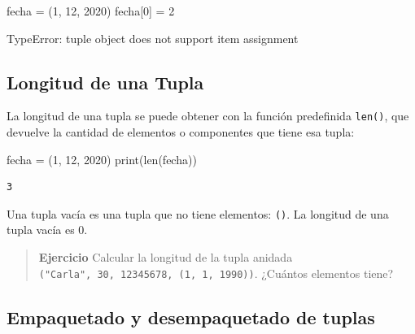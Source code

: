 \documentclass[
  letterpaper,
  DIV=11,
  numbers=noendperiod]{scrreprt}
\newenvironment{Shaded}{\begin{snugshade}}{\end{snugshade}}
\newcommand{\BuiltInTok}[1]{\textcolor[rgb]{0.00,0.23,0.31}{#1}}
\newcommand{\DecValTok}[1]{\textcolor[rgb]{0.68,0.00,0.00}{#1}}
\newcommand{\NormalTok}[1]{\textcolor[rgb]{0.00,0.23,0.31}{#1}}
\newcommand{\OperatorTok}[1]{\textcolor[rgb]{0.37,0.37,0.37}{#1}}
\begin{document}
\begin{Shaded}
\begin{Highlighting}[]
\NormalTok{fecha }\OperatorTok{=}\NormalTok{ (}\DecValTok{1}\NormalTok{, }\DecValTok{12}\NormalTok{, }\DecValTok{2020}\NormalTok{)}
\NormalTok{fecha[}\DecValTok{0}\NormalTok{] }\OperatorTok{=} \DecValTok{2}
\end{Highlighting}
\end{Shaded}

\begin{Shaded}
\begin{Highlighting}[]
\NormalTok{TypeError: \textquotesingle{}tuple\textquotesingle{} object does not support item assignment}
\end{Highlighting}
\end{Shaded}

\subsection{Longitud de una Tupla}\label{longitud-de-una-tupla}

La longitud de una tupla se puede obtener con la función predefinida
\texttt{len()}, que devuelve la cantidad de elementos o componentes que
tiene esa tupla:

\begin{Shaded}
\begin{Highlighting}[]
\NormalTok{fecha }\OperatorTok{=}\NormalTok{ (}\DecValTok{1}\NormalTok{, }\DecValTok{12}\NormalTok{, }\DecValTok{2020}\NormalTok{)}
\BuiltInTok{print}\NormalTok{(}\BuiltInTok{len}\NormalTok{(fecha))}
\end{Highlighting}
\end{Shaded}

\begin{verbatim}
3
\end{verbatim}

Una tupla vacía es una tupla que no tiene elementos: \texttt{()}. La
longitud de una tupla vacía es 0.

\begin{quote}
\textbf{Ejercicio} Calcular la longitud de la tupla anidada
\texttt{("Carla",\ 30,\ 12345678,\ (1,\ 1,\ 1990))}. ¿Cuántos elementos
tiene?
\end{quote}

\subsection{Empaquetado y desempaquetado de
tuplas}\label{empaquetado-y-desempaquetado-de-tuplas}
\end{document}

